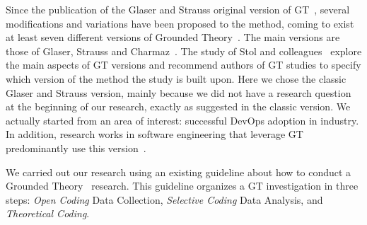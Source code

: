 Since the publication of the Glaser and Strauss original version of GT~\cite{glase1967discovery},
several modifications and variations have been proposed to the method, coming to
exist at least seven different versions of Grounded Theory~\cite{denzin2007grounded}.
The main versions are those of Glaser, Strauss and
Charmaz~\cite{stol2016grounded}. The study of Stol and colleagues~\cite{stol2016grounded}
explore the main aspects of GT versions and recommend authors of GT studies to
specify which version of the method the study is built upon. Here we chose the classic
Glaser and Strauss version, mainly because we did not have a research
question at the beginning of our research, exactly as suggested in the classic
version. We actually started from an area of interest: successful DevOps adoption
in industry. In addition, research works in software engineering that leverage GT
predominantly use this version~\cite{stol2016grounded}.





We carried out our research using an existing
guideline about how to conduct a
Grounded Theory~\cite{adolph2011using} research. This guideline organizes
a GT investigation in three steps: \emph{Open Coding} Data Collection,
\emph{Selective Coding} Data Analysis, and \emph{Theoretical Coding}.


